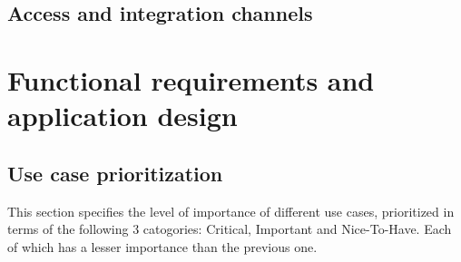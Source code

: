 \documentclass[11pt]{article}
\begin{document}
	\subsection{Access and integration channels}
	
	\newpage
	
	\section{Functional requirements and application design}
	
	\subsection{Use case prioritization}
	This section specifies the level of importance of different use cases, prioritized in terms of the following 3 catogories: Critical, Important and Nice-To-Have. Each of which has a lesser importance than the previous one.
	
\end{document}
